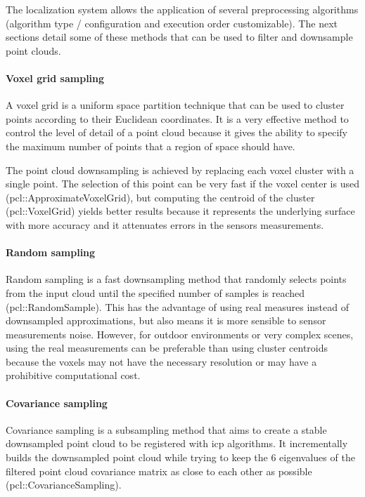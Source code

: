 The localization system allows the application of several preprocessing algorithms (algorithm type / configuration and execution order customizable). The next sections detail some of these methods that can be used to filter and downsample point clouds.


\paragraph{Voxel grid sampling}

A voxel grid is a uniform space partition technique that can be used to cluster points according to their Euclidean coordinates. It is a very effective method to control the level of detail of a point cloud because it gives the ability to specify the maximum number of points that a region of space should have.

The point cloud downsampling is achieved by replacing each voxel cluster with a single point. The selection of this point can be very fast if the voxel center is used (pcl::ApproximateVoxelGrid), but computing the centroid of the cluster (pcl::VoxelGrid) yields better results because it represents the underlying surface with more accuracy and it attenuates errors in the sensors measurements.


\paragraph{Random sampling}

Random sampling \cite{Vitter1984} is a fast downsampling method that randomly selects points from the input cloud until the specified number of samples is reached (pcl::RandomSample). This has the advantage of using real measures instead of downsampled approximations, but also means it is more sensible to sensor measurements noise. However, for outdoor environments or very complex scenes, using the real measurements can be preferable than using cluster centroids because the voxels may not have the necessary resolution or may have a prohibitive computational cost.


\paragraph{Covariance sampling}

Covariance sampling \cite{Gelfand} is a subsampling method that aims to create a stable downsampled point cloud to be registered with \gls{icp} algorithms. It incrementally builds the downsampled point cloud while trying to keep the 6 eigenvalues of the filtered point cloud covariance matrix as close to each other as possible (pcl::CovarianceSampling).


